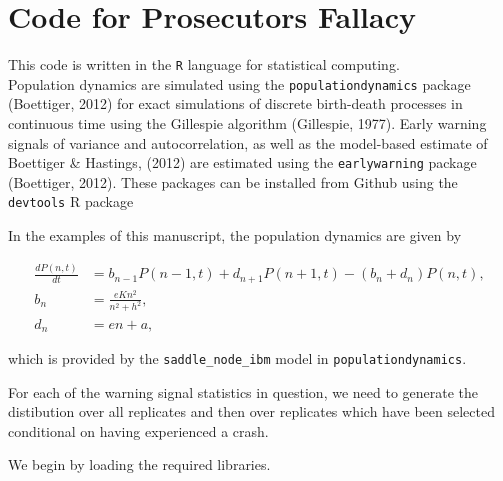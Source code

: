 



\chapter{Code for Prosecutors Fallacy}

This code is written in the \texttt{R} language for statistical
computing.\\Population dynamics are simulated using the
\texttt{populationdynamics} package (Boettiger, 2012) for exact
simulations of discrete birth-death processes in continuous time using
the Gillespie algorithm (Gillespie, 1977). Early warning signals of
variance and autocorrelation, as well as the model-based estimate of
Boettiger \& Hastings, (2012) are estimated using the
\texttt{earlywarning} package (Boettiger, 2012). These packages can be
installed from Github using the \texttt{devtools} R package

\begin{Shaded}
\begin{Highlighting}[]
\NormalTok{(}\NormalTok{, }\NormalTok{)}
\NormalTok{(}\NormalTok{, }\NormalTok{)}
\end{Highlighting}
\end{Shaded}
In the examples of this manuscript, the population dynamics are given by

\begin{align}
  \frac{dP(n,t)}{dt} &= b_{n-1} P(n-1,t) + d_{n+1}P(n+1,t) - (b_n+d_n) P(n,t)  \label{master}, \\
    b_n &= \frac{e K n^2}{n^2 + h^2}, \\
    d_n &= e n + a,
\end{align}

which is provided by the \texttt{saddle\_node\_ibm} model in
\texttt{populationdynamics}.

For each of the warning signal statistics in question, we need to
generate the distibution over all replicates and then over replicates
which have been selected conditional on having experienced a crash.

We begin by loading the required libraries.

\begin{Shaded}
\begin{Highlighting}[]
\end{Highlighting}
\end{Shaded}
